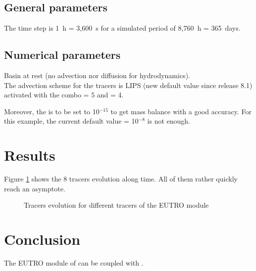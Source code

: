 \subsection{General parameters}

The time step is 1~h = 3,600~s for a simulated period of 8,760~h = 365~days.

\subsection{Numerical parameters}

Basin at rest (no advection nor diffusion for hydrodynamics).\\

The advection scheme for the tracers is LIPS (new default value since release 8.1) activated
with the combo  = 5
and  = 4.

Moreover, the  is to be set to 10$^{-15}$ to
get mass balance with a good accuracy.
For this example, the current default value = 10$^{-8}$ is not enough.

\section{Results}

Figure \ref{fig:waq3d_eutro:res} shows the 8 tracers evolution along time.
All of them rather quickly reach an asymptote.

\begin{figure} [H]
\centering
{}
 \caption{Tracers evolution for different tracers of the EUTRO module}
 \label{fig:waq3d_eutro:res}
\end{figure}

\section{Conclusion}

The EUTRO module of \waqtel can be coupled with .
